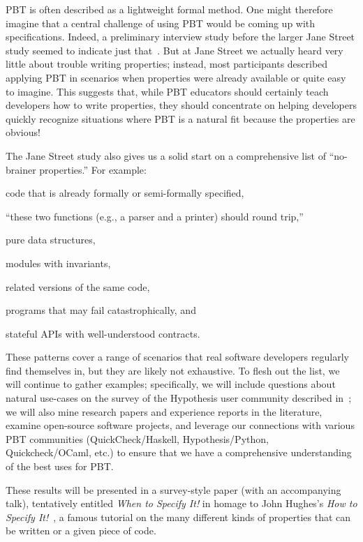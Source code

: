 PBT is often described as a lightweight formal method.  One
might therefore imagine that a central challenge of using PBT would be
coming up with specifications. Indeed, a preliminary interview
study before the larger Jane Street study seemed to indicate just
that~\cite{ref:goldstein2022some}. But at
Jane Street we actually heard very little about trouble
writing
properties; instead, most participants described applying PBT in scenarios when
properties were already available or quite easy to imagine. This suggests that,
while PBT educators should certainly teach developers how to
write properties, they should concentrate on
helping developers quickly recognize situations where PBT is a
natural fit because the properties are obvious!

The Jane Street study also gives us a solid start on a comprehensive list of
``no-brainer properties.''  For example:
\begin{enumerate*}[label=(1)]
\item code that is already formally or semi-formally specified,
\item ``these two functions (e.g., a parser and a printer) should
round trip,'' 
\item pure data structures,
\item modules with invariants,
\item related versions of the same code,
\item programs that may fail catastrophically,
and
\item stateful APIs with well-understood contracts.
\end{enumerate*}
These patterns cover a range of
scenarios that real software developers regularly find themselves in, but they
are likely not exhaustive. To flesh out the list, we will continue to
gather examples; specifically, we will include
questions about natural use-cases on the survey of the Hypothesis user
community described in~; we will also mine
research papers and experience reports in the literature,
examine open-source software projects, and leverage our connections with various
PBT communities (QuickCheck/Haskell, Hypothesis/Python, Quickcheck/OCaml, etc.)
to ensure that we have a comprehensive understanding of the best uses for PBT.

These results will be presented in a survey-style paper (with an
accompanying talk), tentatively entitled {\em When to Specify It!} in
homage to John Hughes's {\em How to Specify
  It!}~\cite{HowToSpecifyIt}, a famous tutorial on the many different
kinds of properties that can be written or a given piece of code.

